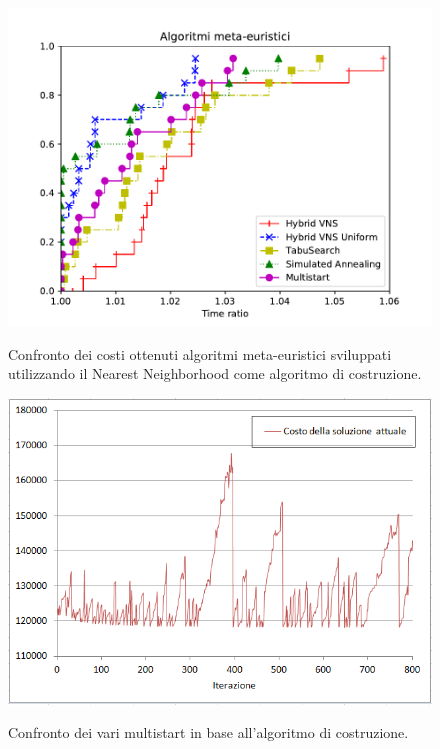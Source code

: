 \begin{figure}[h] 
\begin{center} 
  \includegraphics[scale=0.8]{Images/pp_heuristic}\\ 
  \caption{\footnotesize{Confronto dei costi ottenuti algoritmi meta-euristici sviluppati utilizzando il Nearest Neighborhood come algoritmo di costruzione.}}
  \label{perf_profile} 
\end{center} 
\end{figure}

\begin{figure}[h] 
\begin{center} 
  \includegraphics[scale=0.7]{Images/cost_vns}\\ 
  \caption{\footnotesize{Confronto dei vari multistart in base all'algoritmo di costruzione.}}
  \label{perf_profile} 
\end{center} 
\end{figure}

